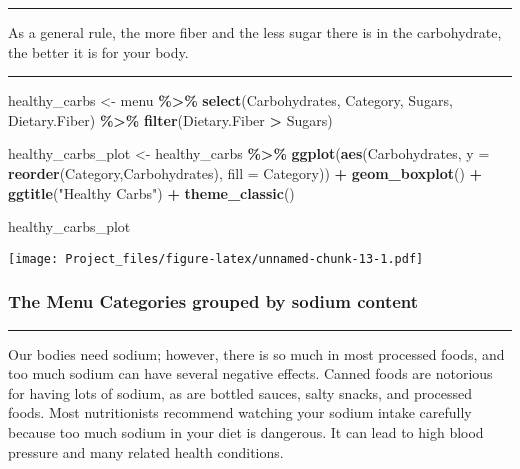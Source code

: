 \documentclass[
]{article}
\newenvironment{Shaded}{\begin{snugshade}}{\end{snugshade}}
\newcommand{\AttributeTok}[1]{\textcolor[rgb]{0.13,0.29,0.53}{#1}}
\newcommand{\FunctionTok}[1]{\textcolor[rgb]{0.13,0.29,0.53}{\textbf{#1}}}
\newcommand{\NormalTok}[1]{#1}
\newcommand{\OtherTok}[1]{\textcolor[rgb]{0.56,0.35,0.01}{#1}}
\newcommand{\SpecialCharTok}[1]{\textcolor[rgb]{0.81,0.36,0.00}{\textbf{#1}}}
\newcommand{\StringTok}[1]{\textcolor[rgb]{0.31,0.60,0.02}{#1}}
\begin{document}
\begin{center}\rule{0.5\linewidth}{0.5pt}\end{center}

As a general rule, the more fiber and the less sugar there is in the
carbohydrate, the better it is for your body.

\begin{center}\rule{0.5\linewidth}{0.5pt}\end{center}

\begin{Shaded}
\begin{Highlighting}[]
\NormalTok{healthy\_carbs }\OtherTok{\textless{}{-}}\NormalTok{  menu }\SpecialCharTok{\%\textgreater{}\%} 
  \FunctionTok{select}\NormalTok{(Carbohydrates,}
\NormalTok{         Category,}
\NormalTok{         Sugars,}
\NormalTok{         Dietary.Fiber)  }\SpecialCharTok{\%\textgreater{}\%}  
  \FunctionTok{filter}\NormalTok{(Dietary.Fiber }\SpecialCharTok{\textgreater{}}\NormalTok{ Sugars)}

\NormalTok{healthy\_carbs\_plot }\OtherTok{\textless{}{-}}\NormalTok{ healthy\_carbs }\SpecialCharTok{\%\textgreater{}\%} 
  \FunctionTok{ggplot}\NormalTok{(}\FunctionTok{aes}\NormalTok{(Carbohydrates,}
             \AttributeTok{y =} \FunctionTok{reorder}\NormalTok{(Category,Carbohydrates),}
             \AttributeTok{fill =}\NormalTok{ Category)) }\SpecialCharTok{+}
  \FunctionTok{geom\_boxplot}\NormalTok{() }\SpecialCharTok{+} \FunctionTok{ggtitle}\NormalTok{(}\StringTok{"Healthy Carbs"}\NormalTok{) }\SpecialCharTok{+} \FunctionTok{theme\_classic}\NormalTok{()}



\NormalTok{healthy\_carbs\_plot}
\end{Highlighting}
\end{Shaded}

\texttt{[image: Project\_files/figure-latex/unnamed-chunk-13-1.pdf]}

\hypertarget{the-menu-categories-grouped-by-sodium-content}{%
\subsubsection{The Menu Categories grouped by sodium
content}\label{the-menu-categories-grouped-by-sodium-content}}

\begin{center}\rule{0.5\linewidth}{0.5pt}\end{center}

Our bodies need sodium; however, there is so much in most processed
foods, and too much sodium can have several negative effects. Canned
foods are notorious for having lots of sodium, as are bottled sauces,
salty snacks, and processed foods. Most nutritionists recommend watching
your sodium intake carefully because too much sodium in your diet is
dangerous. It can lead to high blood pressure and many related health
conditions.
\end{document}
